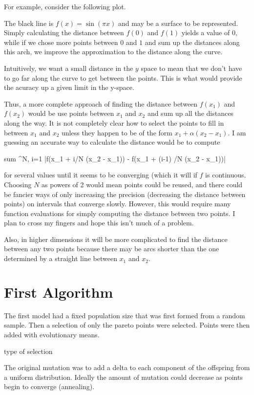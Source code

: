 \documentclass{article}
\begin{document}
{{For example, consider the following plot.



The black line is $f(x) = \sin(\pi x)$ and may be a surface to be represented.
Simply calculating the distance between $f(0)$ and $f(1)$ yields a value of $0$, while if we chose more points between $0$ and $1$ and sum up the distances along this arch,
we improve the approximation to the distance along the curve.

Intuitively, we want a small distance in the $y$ space to mean that we don't have to go far along the curve to get between the points.
This is what would provide the acuracy up a given limit in the y-space.

Thus, a more complete approach of finding the distance between $f(x_1)$ and $f(x_2)$ would be use points between $x_1$ and $x_2$ and sum up all the distances along the way.
It is not completely clear how to select the points to fill in between $x_1$ and $x_2$ unless they happen to be of the form $x_1 + \alpha (x_2 - x_1)$.
I am guessing an accurate way to calculate the distance would be to compute 

sum ^N, i=1   |f(x_1 + i/N (x_2 - x_1)) - f(x_1 + (i-1) /N (x_2 - x_1))| 

for several values until it seems to be converging (which it will if $f$ is continuous.
Choosing $N$ as powers of 2 would mean points could be reused, and there could be fancier ways of only increasing the precision (decreasing the distance between points) on intervals that
converge slowly.
However, this would require many function evaluations for simply computing the distance between two points.
I plan to cross my fingers and hope this isn't much of a problem.

Also, in higher dimensions it will be more complicated to find the distance between any two points because there may be arcs shorter than the one determined by a straight line between $x_1$ and $x_2$.


\section{First Algorithm}

The first model had a fixed population size that was first formed from a random sample.
Then a selection of only the pareto points were selected.
Points were then added with evolutionary means.

type of selection

The original mutation was to add a delta to each component of the offspring from a uniform distribution.
Ideally the amount of mutation could decrease as points begin to converge (annealing).


}}
\end{document}
